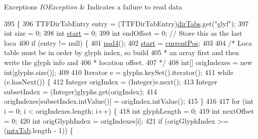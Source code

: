 \begin{DoxyExceptions}{Exceptions}
{\em I\+O\+Exception} & Indicates a failure to read data \\
\hline
\end{DoxyExceptions}

\begin{DoxyCode}
395                                                            \{
396         TTFDirTabEntry entry = (TTFDirTabEntry)\mbox{\hyperlink{classorg_1_1newdawn_1_1slick_1_1tools_1_1hiero_1_1truetype_1_1_t_t_f_file_ace74820d11ce19f9c04797c2715ac728}{dirTabs}}.get(\textcolor{stringliteral}{"glyf"});
397         \textcolor{keywordtype}{int} size = 0;
398         \textcolor{keywordtype}{int} \mbox{\hyperlink{namespaceejemplo_1_1clase_abcf43191f0ecf3b071ca2db7696ba821}{start}} = 0;
399         \textcolor{keywordtype}{int} endOffset = 0;    \textcolor{comment}{// Store this as the last loca}
400         \textcolor{keywordflow}{if} (entry != null) \{
401             \mbox{\hyperlink{classorg_1_1newdawn_1_1slick_1_1tools_1_1hiero_1_1truetype_1_1_t_t_f_sub_set_file_a0c2daa792c418ab2f19378ed0189e713}{pad4}}();
402             \mbox{\hyperlink{namespaceejemplo_1_1clase_abcf43191f0ecf3b071ca2db7696ba821}{start}} = \mbox{\hyperlink{classorg_1_1newdawn_1_1slick_1_1tools_1_1hiero_1_1truetype_1_1_t_t_f_sub_set_file_a5027011db0d9c307afa8de09102eaa10}{currentPos}};
403 
404             \textcolor{comment}{/* Loca table must be in order by glyph index, so build}
405 \textcolor{comment}{             * an array first and then write the glyph info and}
406 \textcolor{comment}{             * location offset.}
407 \textcolor{comment}{             */}
408             \textcolor{keywordtype}{int}[] origIndexes = \textcolor{keyword}{new} \textcolor{keywordtype}{int}[glyphs.size()];
409 
410             Iterator e = glyphs.keySet().iterator();
411             \textcolor{keywordflow}{while} (e.hasNext()) \{
412                 Integer origIndex = (Integer)e.next();
413                 Integer subsetIndex = (Integer)glyphs.get(origIndex);
414                 origIndexes[subsetIndex.intValue()] = origIndex.intValue();
415             \}
416 
417             \textcolor{keywordflow}{for} (\textcolor{keywordtype}{int} i = 0; i < origIndexes.length; i++) \{
418                 \textcolor{keywordtype}{int} glyphLength = 0;
419                 \textcolor{keywordtype}{int} nextOffset = 0;
420                 \textcolor{keywordtype}{int} origGlyphIndex = origIndexes[i];
421                 \textcolor{keywordflow}{if} (origGlyphIndex >= (\mbox{\hyperlink{classorg_1_1newdawn_1_1slick_1_1tools_1_1hiero_1_1truetype_1_1_t_t_f_file_ad78a13682e242fc4a0b5d34a8e5807fa}{mtxTab}}.length - 1)) \{

\end{DoxyCode}

